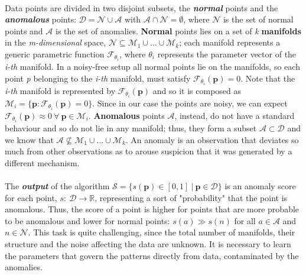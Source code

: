 \paragraph{}
Data points are divided in two disjoint subsets, the \textbf{\textit{normal}} points and the \textbf{\textit{anomalous}} points: $\mathcal{D} = \mathcal{N} \cup \mathcal{A}$ with $\mathcal{A} \cap \mathcal{N} = \emptyset$, where $\mathcal{N}$ is the set of normal points and $\mathcal{A}$ is the set of anomalies. \newline
\textbf{Normal} points lies on a set of \textit{k} \textbf{manifolds} in the \textit{m-dimensional} space, $\mathcal{N} \subseteq \mathcal{M}_1 \cup ... \cup \mathcal{M}_k$; each manifold represents a generic parametric function $\mathcal{F}_{\theta_i}$, where $\theta_i$ represents the parameter vector of the \textit{i-th} manifold. In a noisy-free setup all normal points lie on the manifolds, so each point \textit{p} belonging to the \textit{i-th} manifold, must satisfy $\mathcal{F}_{\theta_i}(\textbf{p}) = 0$. Note that the \textit{i-th} manifold is represented by $\mathcal{F}_{\theta_i}(\textbf{p})$ and so it is composed as $\mathcal{M}_i = \{ \textbf{p} : \mathcal{F}_{\theta_i}(\textbf{p}) = 0 \}$. Since in our case the points are noisy, we can expect $\mathcal{F}_{\theta_i}(\textbf{p}) \approx 0\ \forall\ \textbf{p} \in \mathcal{M}_i$.  \newline
\textbf{Anomalous} points $\mathcal{A}$, instead, do not have a standard behaviour and so do not lie in any manifold; thus, they form a subset $\mathcal{A} \subset \mathcal{D}$ and we know that $\mathcal{A} \not\subseteq \mathcal{M}_1 \cup ... \cup \mathcal{M}_k$. An anomaly is an observation that deviates so much from other observations as to arouse suspicion that it was generated by a different mechanism.

\paragraph{}
The \textbf{\textit{output}} of the algorithm $\mathcal{S} = \{s(\textbf{p}) \in [0, 1]\ |\ \textbf{p} \in \mathcal{D}\}$ is an anomaly score for each point, $s:\ \mathcal{D} \to \mathbb{R}$, representing a sort of "probability" that the point is anomalous. Thus, the score of a point is higher for points that are more probable to be anomalous and lower for normal points: $s(a) \gg s(n)$ for all $a \in \mathcal{A}$ and $n \in \mathcal{N}$.
\newline
This task is quite challenging, since the total number of manifolds, their structure and the noise affecting the data are unknown. It is necessary to learn the parameters that govern the patterns directly from data, contaminated by the anomalies.

